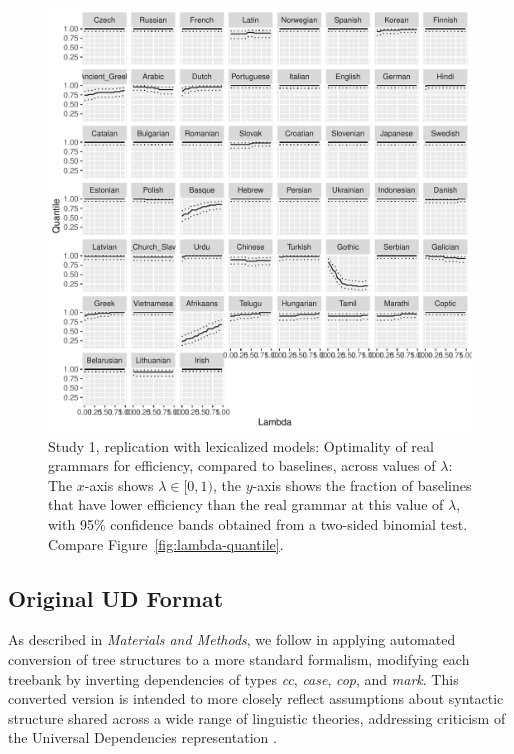 \documentclass[10pt,twoside,lineno]{article}
\begin{document}
\begin{figure}
	\centering
	\includegraphics[width=\textwidth]{../results/plane/unlexicalized/analyze_pareto_optimality/figures/quantileByLambda.pdf}
	\caption{Study 1, replication with lexicalized models: Optimality of real grammars for efficiency, compared to baselines, across values of $\lambda$: The $x$-axis shows $\lambda \in [0,1)$, the $y$-axis shows the fraction of baselines that have lower efficiency than the real grammar at this value of $\lambda$, with 95\% confidence bands obtained from a two-sided binomial test. Compare Figure~\ref{fig:lambda-quantile}.}\label{fig:lambda-quantile-noPOS}
\end{figure}


\subsection{Original UD Format}

As described in \emph{Materials and Methods}, we follow \cite{futrell2015largescale} in applying automated conversion of tree structures to a more standard formalism, modifying each treebank by inverting dependencies of types \textit{cc}, \textit{case}, \textit{cop}, and \textit{mark}.
This converted version is intended to more closely reflect assumptions about syntactic structure shared across a wide range of linguistic theories, addressing criticism of the Universal Dependencies representation \cite{osborne2019status}.
\end{document}
